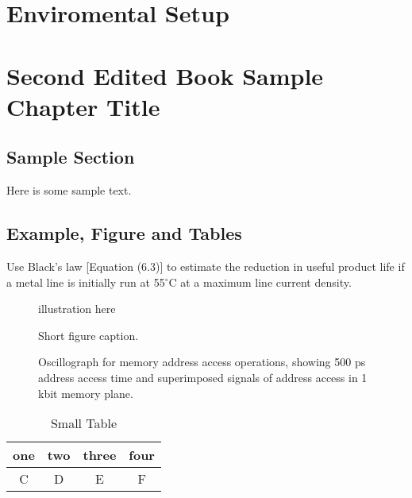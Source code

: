 \documentclass{wileySix}
\begin{document}
\chapter{Enviromental Setup}



\chapter{Second Edited Book Sample Chapter Title}

\section{Sample Section}
Here is some sample text.

\newpage

\section{Example, Figure and Tables}
\vskip6pt
\begin{example}
Use Black's law [Equation (6.3)] to estimate the reduction in useful product
life if a metal line is initially run at 55$^\circ$C at a maximum line
current density.
\end{example}




\begin{figure}[ht]
illustration here
\caption{Short figure caption.}
\end{figure}

\begin{figure}[ht]
\vskip2pt
\caption{Oscillograph for  memory address access operations,
showing 500 ps
address access time and superimposed signals
of address access in 1 kbit
memory plane.}
\end{figure}

\begin{table}[ht]
\caption{Small Table}
\centering
\begin{tabular}{cccc}
\hline
one&two&three&four\\
\hline
C&D&E&F\\
\hline
\end{tabular}
\end{table}
\end{document}
